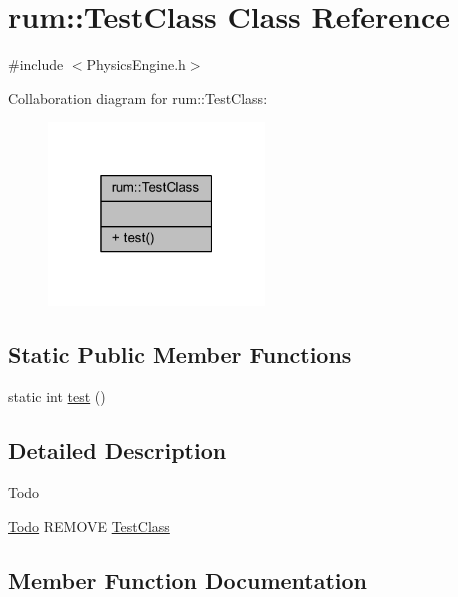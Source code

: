 \hypertarget{classrum_1_1_test_class}{}\section{rum\+:\+:Test\+Class Class Reference}
\label{classrum_1_1_test_class}


{\ttfamily \#include $<$Physics\+Engine.\+h$>$}



Collaboration diagram for rum\+:\+:Test\+Class\+:\nopagebreak
\begin{figure}[H]
\begin{center}
\leavevmode
\includegraphics[width=163pt]{classrum_1_1_test_class__coll__graph}
\end{center}
\end{figure}
\subsection*{Static Public Member Functions}
\begin{DoxyCompactItemize}
\item 
static int \mbox{\hyperlink{classrum_1_1_test_class_a3c9a822a3ebba9cd021a073938d1f280}{test}} ()
\end{DoxyCompactItemize}


\subsection{Detailed Description}
\begin{DoxyRefDesc}{Todo}
\item[\mbox{\hyperlink{todo__todo000001}{Todo}}]R\+E\+M\+O\+VE \mbox{\hyperlink{classrum_1_1_test_class}{Test\+Class}} \end{DoxyRefDesc}


\subsection{Member Function Documentation}
\mbox{\label{classrum_1_1_test_class_a3c9a822a3ebba9cd021a073938d1f280}} 
